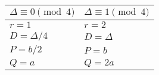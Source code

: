 \documentclass[11pt, letterpaper]{article}
\theoremstyle{definition}
\begin{document}
\begin{center}
\begin{tabular}{l|l}
	$\Delta \equiv 0 \pmod 4$ & $ \Delta \equiv 1 \pmod 4$ \\
	\hline
	$r=1$ & $r=2$ \\
	$D = \Delta/4$ & $D = \Delta$ \\
	$P = b/2$ & $P = b$ \\
	$Q = a$ & $Q = 2a$ \\
\end{tabular}
\end{center}
\end{document}
